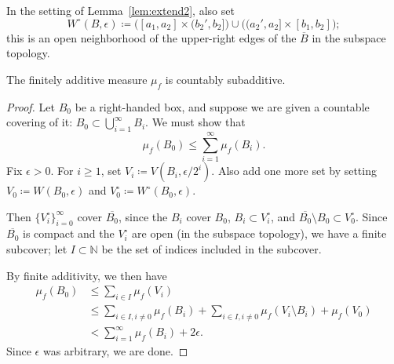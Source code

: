 In the setting of Lemma~\ref{lem:extend2}, also set
\[
  W^\circ(B,\epsilon) \coloneqq \bigl([a_1,a_2] \times (b_2',b_2]\bigr) \cup
    \bigl((a_2',a_2] \times [b_1,b_2]\bigr);
\]
this is an open neighborhood of the upper-right edges of the
$\overline{B}$ in the subspace topology.

\begin{proposition}\label{prop:countablyadditive}
  The finitely additive measure $\mu_f$ is countably subadditive.
\end{proposition}

\begin{proof}
  Let $B_0$ be a right-handed box, and suppose we are given a
  countable covering of it: $B_0 \subset \bigcup_{i=1}^\infty B_i$. We
  must show that
  \[
    \mu_f(B_0) \le \sum_{i=1}^\infty \mu_f(B_i).
  \]
  Fix $\epsilon > 0$. For $i \ge 1$, set
  $V_i \coloneqq V(B_i, \epsilon/2^i)$. Also add one more set by setting
  $V_0 \coloneqq W(B_0,\epsilon)$ and $V_0^\circ \coloneqq W^\circ(B_0,\epsilon)$.

  Then $\{V_i^\circ\}_{i=0}^\infty$ cover $\overline{B_0}$, since
  the $B_i$ cover $B_0$, $B_i \subset V_i^\circ$, and
  $\overline{B_0}\setminus B_0 \subset V_0^\circ$. Since
  $\overline{B_0}$ is compact and the $V_i^\circ$ are open (in the
  subspace topology), we have a finite subcover; let $I \subset
  \mathbb{N}$ be the set of
  indices included in the subcover.

  By finite additivity, we then have
  \begin{align*}
    \mu_f(B_0) &\le \sum_{i \in I} \mu_f(V_i)\\
      &\le \sum_{i \in I, i \ne 0} \mu_f(B_i) + \sum_{i \in I, i \ne 0}
        \mu_f(V_i \setminus B_i) + \mu_f(V_0)\\
      &< \sum_{i=1}^\infty \mu_f(B_i) + 2\epsilon.
  \end{align*}
  Since $\epsilon$ was arbitrary, we are done.
\end{proof}


\begin{figure}
\end{figure}

